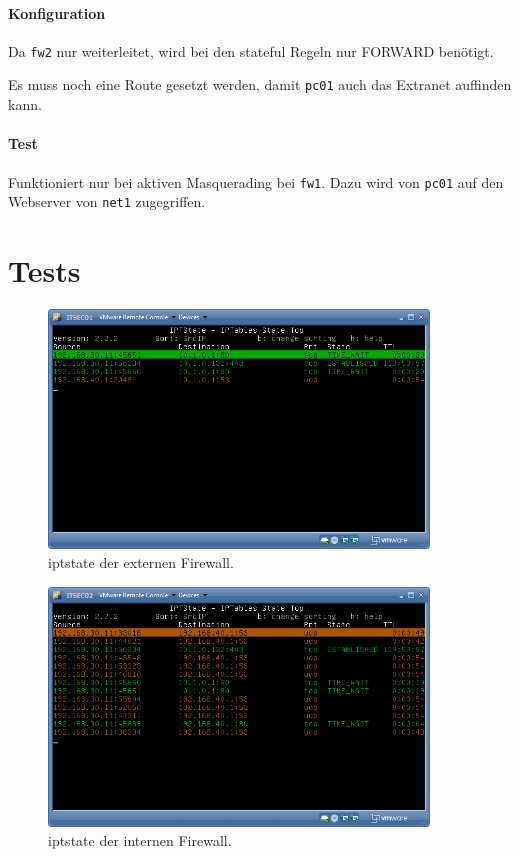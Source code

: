 \paragraph{Konfiguration}

Da {\tt fw2} nur weiterleitet, wird bei den stateful
Regeln nur FORWARD benötigt.

Es muss noch eine Route gesetzt werden, damit {\tt pc01} auch das Extranet
auffinden kann.

\paragraph{Test} Funktioniert nur bei aktiven Masquerading bei {\tt fw1}.
Dazu wird von {\tt pc01} auf den Webserver von {\tt net1} zugegriffen.


\section{Tests}\label{sec.tests}

\begin{figure}[h!]
  \centering
    \includegraphics[width=0.9\textwidth]{figures/iptstate-extern.png}
  \caption{iptstate der externen Firewall.}
  \label{fig.iptstate-extern}
\end{figure}

\begin{figure}[h!]
  \centering
    \includegraphics[width=0.9\textwidth]{figures/iptstate-intern.png}
  \caption{iptstate der internen Firewall.}
  \label{fig.iptstate-intern}
\end{figure}


